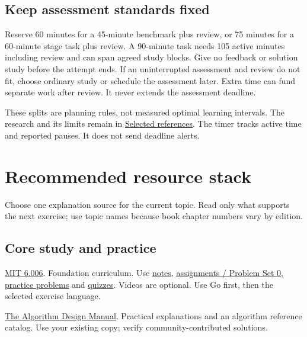 \documentclass[11pt,letterpaper]{article}
\begin{document}
\subsection*{Keep assessment standards fixed}

Reserve 60 minutes for a 45-minute benchmark plus review, or 75 minutes for a 60-minute stage task plus review. A 90-minute task needs 105 active minutes including review and can span agreed study blocks. Give no feedback or solution study before the attempt ends. If an uninterrupted assessment and review do not fit, choose ordinary study or schedule the assessment later. Extra time can fund separate work after review. It never extends the assessment deadline.

These splits are planning rules, not measured optimal learning intervals. The research and its limits remain in \hyperref[sec:27]{Selected references}. The timer tracks active time and reported pauses. It does not send deadline alerts.

\clearpage
\section{Recommended resource stack}\label{sec:26}

Choose one explanation source for the current topic. Read only what supports the next exercise; use topic names because book chapter numbers vary by edition.

\subsection*{Core study and practice}

\href{https://ocw.mit.edu/courses/6-006-introduction-to-algorithms-spring-2020/}{MIT 6.006}. Foundation curriculum. Use \href{https://ocw.mit.edu/courses/6-006-introduction-to-algorithms-spring-2020/pages/lecture-notes/}{notes}, \href{https://ocw.mit.edu/courses/6-006-introduction-to-algorithms-spring-2020/pages/assignments/}{assignments / Problem Set 0}, \href{https://ocw.mit.edu/courses/6-006-introduction-to-algorithms-spring-2020/pages/practice-problems/}{practice problems} and \href{https://ocw.mit.edu/courses/6-006-introduction-to-algorithms-spring-2020/pages/quizzes/}{quizzes}. Videos are optional. Use Go first, then the selected exercise language.

\href{https://algorist.com/}{The Algorithm Design Manual}. Practical explanations and an algorithm reference catalog. Use your existing copy; verify community-contributed solutions.
\end{document}
